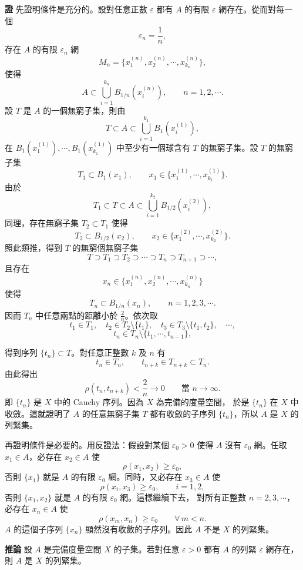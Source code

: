 \documentclass[11pt,a4paper,twoside]{article}
\begin{document}
\noindent\textbf{證}\quad
先證明條件是充分的。設對任意正數 $\varepsilon$ 都有 $A$ 的有限
$\varepsilon$ 網存在。從而對每一個
\[
    \varepsilon_n=\frac1n,
\]
存在 $A$ 的有限 $\varepsilon_n$ 網
\[
    M_n=\{x_1^{(n)},x_2^{(n)},\cdots,x_{k_n}^{(n)}\},
\]
使得
\[
    A\subset\bigcup_{i=1}^{k_n}B_{1/n}(x_i^{(n)}),
    \qquad n=1,2,\cdots .
\]
設 $T$ 是 $A$ 的一個無窮子集，則由
\[
    T\subset A\subset \bigcup_{i=1}^{k_1}B_1(x_i^{(1)}),
\]
在 $B_1(x_1^{(1)}),\cdots,B_1(x_{k_1}^{(1)})$ 中至少有一個球含有
$T$ 的無窮子集。設 $T$ 的無窮子集
\[
    T_1\subset B_1(x_1),
    \qquad
    x_1\in\{x_1^{(1)},\cdots,x_{k_1}^{(1)}\}.
\]
由於
\[
    T_1\subset T\subset A\subset
    \bigcup_{i=1}^{k_2}B_{1/2}(x_i^{(2)}),
\]
同理，存在無窮子集 $T_2\subset T_1$ 使得
\[
    T_2\subset B_{1/2}(x_2),
    \qquad
    x_2\in\{x_1^{(2)},\cdots,x_{k_2}^{(2)}\}.
\]
照此類推，得到 $T$ 的無窮個無窮子集
\[
    T\supset T_1\supset T_2\supset\cdots\supset T_n\supset T_{n+1}\supset\cdots ,
\]
且存在
\[
    x_n\in\{x_1^{(n)},x_2^{(n)},\cdots,x_{k_n}^{(n)}\}
\]
使得
\[
    T_n\subset B_{1/n}(x_n),\qquad n=1,2,3,\cdots .
\]
因而 $T_n$ 中任意兩點的距離小於 $\frac2n$。依次取
\[
    t_1\in T_1,\quad
    t_2\in T_2\setminus\{t_1\},\quad
    t_3\in T_3\setminus\{t_1,t_2\},\quad\cdots,
\]
\[
    t_n\in T_n\setminus\{t_1,\cdots,t_{n-1}\},
\]

\newpage

得到序列 $\{t_n\}\subset T$。對任意正整數 $k$ 及 $n$ 有
\[
    t_n\in T_n,\qquad
    t_{n+k}\in T_{n+k}\subset T_n.
\]
由此得出
\[
    \rho(t_n,t_{n+k})<\frac2n\to0
    \qquad \text{當 }n\to\infty.
\]
即 $\{t_n\}$ 是 $X$ 中的 Cauchy 序列。因為 $X$ 為完備的度量空間，
於是 $\{t_n\}$ 在 $X$ 中收斂。這就證明了 $A$ 的任意無窮子集 $T$
都有收斂的子序列 $\{t_n\}$，所以 $A$ 是 $X$ 的列緊集。

再證明條件是必要的。用反證法：假設對某個 $\varepsilon_0>0$ 使得 $A$
沒有 $\varepsilon_0$ 網。任取 $x_1\in A$，必存在 $x_2\in A$ 使
\[
    \rho(x_1,x_2)\ge\varepsilon_0,
\]
否則 $\{x_1\}$ 就是 $A$ 的有限 $\varepsilon_0$ 網。同時，又必存在
$x_3\in A$ 使
\[
    \rho(x_i,x_3)\ge\varepsilon_0,\qquad i=1,2,
\]
否則 $\{x_1,x_2\}$ 就是 $A$ 的有限 $\varepsilon_0$ 網。這樣繼續下去，
對所有正整數 $n=2,3,\cdots$，必存在 $x_n\in A$ 使
\[
    \rho(x_m,x_n)\ge\varepsilon_0
    \qquad \forall\,m<n.
\]
$A$ 的這個子序列 $\{x_n\}$ 顯然沒有收斂的子序列。因此 $A$ 不是 $X$
的列緊集。

\noindent\textbf{推論}\quad
設 $A$ 是完備度量空間 $X$ 的子集。若對任意 $\varepsilon>0$ 都有
$A$ 的列緊 $\varepsilon$ 網存在，則 $A$ 是 $X$ 的列緊集。
\end{document}
